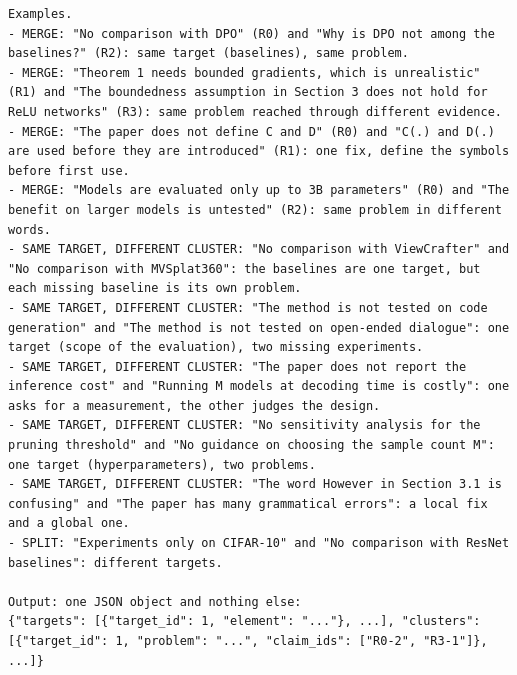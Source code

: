 \begin{lstlisting}
Examples.
- MERGE: "No comparison with DPO" (R0) and "Why is DPO not among the baselines?" (R2): same target (baselines), same problem.
- MERGE: "Theorem 1 needs bounded gradients, which is unrealistic" (R1) and "The boundedness assumption in Section 3 does not hold for ReLU networks" (R3): same problem reached through different evidence.
- MERGE: "The paper does not define C and D" (R0) and "C(.) and D(.) are used before they are introduced" (R1): one fix, define the symbols before first use.
- MERGE: "Models are evaluated only up to 3B parameters" (R0) and "The benefit on larger models is untested" (R2): same problem in different words.
- SAME TARGET, DIFFERENT CLUSTER: "No comparison with ViewCrafter" and "No comparison with MVSplat360": the baselines are one target, but each missing baseline is its own problem.
- SAME TARGET, DIFFERENT CLUSTER: "The method is not tested on code generation" and "The method is not tested on open-ended dialogue": one target (scope of the evaluation), two missing experiments.
- SAME TARGET, DIFFERENT CLUSTER: "The paper does not report the inference cost" and "Running M models at decoding time is costly": one asks for a measurement, the other judges the design.
- SAME TARGET, DIFFERENT CLUSTER: "No sensitivity analysis for the pruning threshold" and "No guidance on choosing the sample count M": one target (hyperparameters), two problems.
- SAME TARGET, DIFFERENT CLUSTER: "The word However in Section 3.1 is confusing" and "The paper has many grammatical errors": a local fix and a global one.
- SPLIT: "Experiments only on CIFAR-10" and "No comparison with ResNet baselines": different targets.

Output: one JSON object and nothing else:
{"targets": [{"target_id": 1, "element": "..."}, ...], "clusters": [{"target_id": 1, "problem": "...", "claim_ids": ["R0-2", "R3-1"]}, ...]}
\end{lstlisting}
